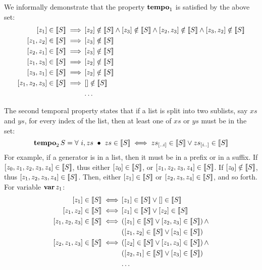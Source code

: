 We informally demonstrate that the property $\tempo[1]{}$ is satisfied by the above set:
\begin{align}
\listsin{z_1} \in \denote{S} \implies & 
\listsin{z_2} \notin \denote{S} \land
\listsin{z_3} \notin \denote{S} \land
\listsin{z_2,z_3}\notin \denote{S} \land
\listsin{z_3,z_2}\notin \denote{S}\nonumber\\
\listsin{z_1,z_2} \in \denote{S} \implies &
\listsin{z_3} \notin \denote{S}\nonumber\\
\listsin{z_2,z_1} \in \denote{S} \implies &
\listsin{z_3} \notin \denote{S}\nonumber\\
\listsin{z_1,z_3} \in \denote{S} \implies &
\listsin{z_2} \notin \denote{S}\nonumber\\
\listsin{z_3,z_1} \in \denote{S} \implies &
\listsin{z_2} \notin \denote{S}\nonumber\\
\listsin{z_1,z_2,z_3} \in \denote{S} \implies &
\listsin{} \notin \denote{S}\nonumber\\
&\ldots\nonumber
\end{align}

The second temporal property states that if a list is split into two sublists, say $xs$ and $ys$, for every index of the list, then at least one of $xs$ or $ys$ must be in the set:
%
\begin{equation}
\tempo[2]{S} = \forall~ i, zs ~\bullet~
zs \in \denote{S} \iff
\sliceright{zs}{i} \in \denote{S} \lor \sliceleft{zs}{i} \in \denote{S}\label{def:tempo2}
\end{equation}
%
For example, if a generator is in a list, then it must be in a prefix or in a suffix.
If $\listsin{z_0,z_1,z_2,z_3,z_4} \in \denote{S}$, thus either $\listsin{z_0}\in\denote{S}$, or $\listsin{z_1,z_2,z_3,z_4} \in \denote{S}$.
If $\listsin{z_0} \notin \denote{S}$, thus $\listsin{z_1,z_2,z_3,z_4} \in \denote{S}$.
Then, either $\listsin{z_1} \in \denote{S}$ or $\listsin{z_2,z_3,z_4} \in \denote{S}$, and so forth.
For variable $\var{z_1}$:
%
\begin{align}
\listsin{z_1} \in \denote{S} \iff &
  \listsin{z_1} \in \denote{S} \lor \listsin{} \in \denote{S}\nonumber\\
\listsin{z_1,z_2} \in \denote{S} \iff &
  \listsin{z_1} \in \denote{S} \lor \listsin{z_2} \in \denote{S}\nonumber\\
\listsin{z_1,z_2,z_3} \in \denote{S} \iff &
  \left(\listsin{z_1} \in \denote{S} \lor \listsin{z_2,z_3} \in \denote{S}\right) \land\nonumber\\
  &\left(\listsin{z_1,z_2} \in \denote{S} \lor \listsin{z_3} \in \denote{S}\right)
  \nonumber\\
\listsin{z_2,z_1,z_3} \in \denote{S} \iff &
  \left(\listsin{z_2} \in \denote{S} \lor \listsin{z_1,z_3} \in \denote{S}\right) \land\nonumber\\
  &\left(\listsin{z_2,z_1} \in \denote{S} \lor \listsin{z_3} \in \denote{S}\right)
  \nonumber\\
& \ldots\nonumber
\end{align}

